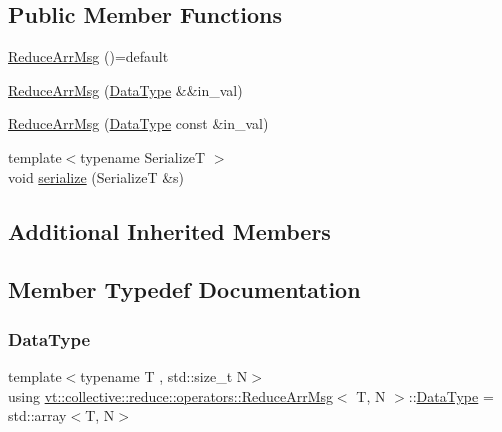 \subsection*{Public Member Functions}
\begin{DoxyCompactItemize}
\item 
\hyperlink{structvt_1_1collective_1_1reduce_1_1operators_1_1_reduce_arr_msg_a3b3aa1ecb078b1c733a81cd79be27e00}{Reduce\+Arr\+Msg} ()=default
\item 
\hyperlink{structvt_1_1collective_1_1reduce_1_1operators_1_1_reduce_arr_msg_a88bdfa2c0fad10fd90331f00272c5816}{Reduce\+Arr\+Msg} (\hyperlink{structvt_1_1collective_1_1reduce_1_1operators_1_1_reduce_arr_msg_a09afd457c37f46ed8ea06f8075195a16}{Data\+Type} \&\&in\+\_\+val)
\item 
\hyperlink{structvt_1_1collective_1_1reduce_1_1operators_1_1_reduce_arr_msg_a3878c089682cd26d80245e575a2d9a54}{Reduce\+Arr\+Msg} (\hyperlink{structvt_1_1collective_1_1reduce_1_1operators_1_1_reduce_arr_msg_a09afd457c37f46ed8ea06f8075195a16}{Data\+Type} const \&in\+\_\+val)
\item 
{\footnotesize template$<$typename SerializeT $>$ }\\void \hyperlink{structvt_1_1collective_1_1reduce_1_1operators_1_1_reduce_arr_msg_a436aa4e6415efa4eb0ca5540124ad0e0}{serialize} (SerializeT \&s)
\end{DoxyCompactItemize}
\subsection*{Additional Inherited Members}


\subsection{Member Typedef Documentation}
\mbox{\label{structvt_1_1collective_1_1reduce_1_1operators_1_1_reduce_arr_msg_a09afd457c37f46ed8ea06f8075195a16}} 
\subsubsection{\texorpdfstring{Data\+Type}{DataType}}
{\footnotesize\ttfamily template$<$typename T , std\+::size\+\_\+t N$>$ \\
using \hyperlink{structvt_1_1collective_1_1reduce_1_1operators_1_1_reduce_arr_msg}{vt\+::collective\+::reduce\+::operators\+::\+Reduce\+Arr\+Msg}$<$ T, N $>$\+::\hyperlink{structvt_1_1collective_1_1reduce_1_1operators_1_1_reduce_arr_msg_a09afd457c37f46ed8ea06f8075195a16}{Data\+Type} =  std\+::array$<$T, N$>$}

